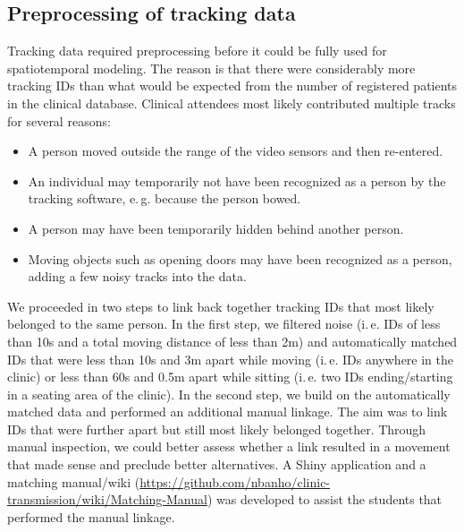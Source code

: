 \documentclass[fleqn,11pt]{wlscirep_supp}
\newcommand\ie{i.\,e.\xspace}
\newcommand\eg{e.\,g.\xspace}
\begin{document}
\clearpage

\subsection{Preprocessing of tracking data}

Tracking data required preprocessing before it could be fully used for spatiotemporal modeling. The reason is that there were considerably more tracking IDs than what would be expected from the number of registered patients in the clinical database. Clinical attendees most likely contributed multiple tracks for several reasons: 
\begin{itemize}
    \item A person moved outside the range of the video sensors and then re-entered. 
    \item An individual may temporarily not have been recognized as a person by the tracking software, \eg because the person bowed.
    \item A person may have been temporarily hidden behind another person.
    \item Moving objects such as opening doors may have been recognized as a person, adding a few noisy tracks into the data.
\end{itemize}
We proceeded in two steps to link back together tracking IDs that most likely belonged to the same person. In the first step, we filtered noise (\ie IDs of less than 10s and a total moving distance of less than 2m) and automatically matched IDs that were less than 10s and 3m apart while moving (\ie IDs anywhere in the clinic) or less than 60s and 0.5m apart while sitting (\ie two IDs ending/starting in a seating area of the clinic). In the second step, we build on the automatically matched data and performed an additional manual linkage. The aim was to link IDs that were further apart but still most likely belonged together. Through manual inspection, we could better assess whether a link resulted in a movement that made sense and preclude better alternatives. A Shiny application and a matching manual/wiki (\url{https://github.com/nbanho/clinic-transmission/wiki/Matching-Manual}) was developed to assist the students that performed the manual linkage. 
\end{document}
